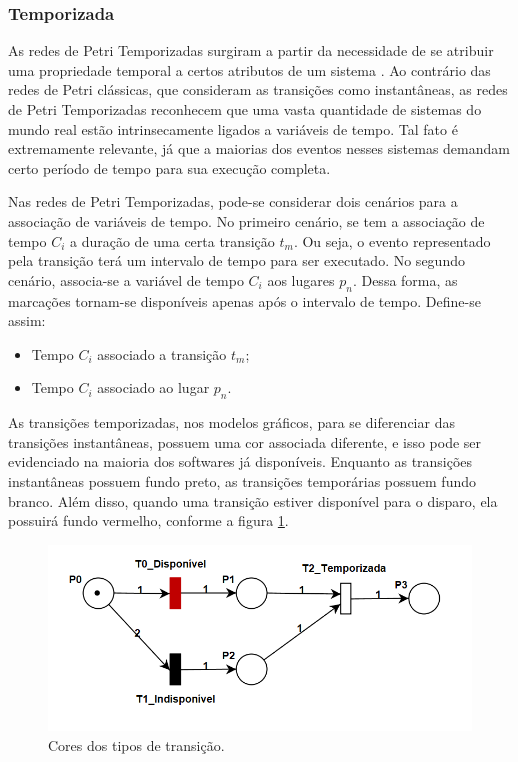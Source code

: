 \documentclass[
	12pt,				%
	openright,			%
	oneside,			%
	a4paper,			%
	english,			%
	brazil				%
	]{abntex2}
\begin{document}
\subsubsection*{Temporizada} \label{cap:redeTemporizada}

As redes de Petri Temporizadas surgiram a partir da necessidade de se atribuir uma propriedade temporal a certos atributos de um sistema \cite{Lima2008}. Ao contrário das redes de Petri clássicas, que consideram as transições como instantâneas, as redes de Petri Temporizadas reconhecem que uma vasta quantidade de sistemas do mundo real estão intrinsecamente ligados a variáveis de tempo. Tal fato é extremamente relevante, já que a maiorias dos eventos nesses sistemas demandam certo período de tempo para sua execução completa.

Nas redes de Petri Temporizadas, pode-se considerar dois cenários para a associação de variáveis de tempo. No primeiro cenário, se tem a associação de tempo $C_{i}$ a duração de uma certa transição $t_{m}$. Ou seja, o evento representado pela transição terá um intervalo de tempo para ser executado. No segundo cenário, associa-se a variável de tempo $C_{i}$ aos lugares $p_{n}$. Dessa forma, as marcações tornam-se disponíveis apenas após o intervalo de tempo. Define-se assim: 

\begin{itemize}
        \item Tempo $C_{i}$ associado a transição $t_{m}$;
        \item Tempo $C_{i}$ associado ao lugar $p_{n}$.
\end{itemize}

As transições temporizadas, nos modelos gráficos, para se diferenciar das transições instantâneas, possuem uma cor associada diferente, e isso pode ser evidenciado na maioria dos softwares já disponíveis. Enquanto as transições instantâneas possuem fundo preto, as transições temporárias possuem fundo branco. Além disso, quando uma transição estiver disponível para o disparo, ela possuirá fundo vermelho, conforme a figura \ref{fig:cores_transição}. 

\begin{figure}[ht] 
	\centering
	\includegraphics[scale=0.75]{figuras/exemplo_cores_transicao.png}
	\caption[Cores dos tipos de transição]{Cores dos tipos de transição.}
	\label{fig:cores_transição}
\end{figure}
\FloatBarrier
\end{document}
